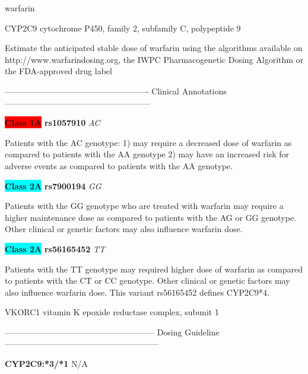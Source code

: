 \documentclass{resume} %
\begin{document}
\begin{rSection}{ warfarin }
\begin{rSubsection}{ CYP2C9 }{ cytochrome P450, family 2, subfamily C, polypeptide 9 }{}{}
\item[] Estimate the anticipated stable dose of warfarin using the algorithms available on http://www.warfarindosing.org, the IWPC Pharmacogenetic Dosing Algorithm or the FDA-approved drug label
\item[] ---------------------------------------------------- Clinical Annotations -----------------------------------------------------\newline
\item \textbf{\colorbox{red} {Class 1A}} \textbf{ rs1057910 } \textit{ AC }
\item[] Patients with the AC genotype: 1) may require a decreased dose of warfarin as compared to patients with the AA genotype 2) may have an increased risk for adverse events as compared to patients with the AA genotype.\item \textbf{\colorbox{cyan} {Class 2A}} \textbf{ rs7900194 } \textit{ GG }
\item[] Patients with the GG genotype who are treated with warfarin may require a higher maintenance dose as compared to patients with the AG or GG genotype.  Other clinical or genetic factors may also influence warfarin dose.\item \textbf{\colorbox{cyan} {Class 2A}} \textbf{ rs56165452 } \textit{ TT }
\item[] Patients with the TT genotype may required higher dose of warfarin as compared to patients with the CT or CC genotype. Other clinical or genetic factors may also influence  warfarin dose. This variant rs56165452 defines CYP2C9*4.
\end{rSubsection}\begin{rSubsection}{ VKORC1 }{ vitamin K epoxide reductase complex, subunit 1 }{}{}
\item[]
\item[] ------------------------------------------------------ Dosing Guideline --------------------------------------------------------\newline
\item[]
\item[] \textbf{ CYP2C9:*3/*1 } N/A


\end{rSubsection}
\end{rSection}
\end{document}
